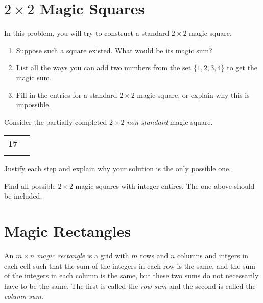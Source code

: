\documentclass[11pt]{article}
\renewenvironment{problem}{\begin{problems}}{\end{problems}\vspace{5pt}}
\begin{document}
\section{$2 \times 2$ Magic Squares}

\begin{problem}[6=2+2+2 points]
In this problem, you will try to construct a standard $2 \times 2$ magic square.
\begin{enumerate}[label=(\alph*)]
\item Suppose such a square existed. What would be its magic sum?

\item List all the ways you can add two numbers from the set $\{1, 2, 3, 4\}$ to get the magic sum.

\item Fill in the entries for a standard $2 \times 2$ magic square, or explain why this is impossible.
\end{enumerate}
\end{problem}

\begin{problem}[4 points]
Consider the partially-completed $2 \times 2$ \textit{non-standard} magic square.
\begin{center}
\begin{tabular}{|c|c|}
\hline
17 & \phantom{17} \\ \hline
 & \\ \hline
\end{tabular}
\end{center}
Justify each step and explain why your solution is the only possible one.
\end{problem}

\begin{problem}[4 points]
Find all possible $2 \times 2$ magic squares with integer entires. The one above should be included.
\end{problem}

\section{Magic Rectangles}

\begin{definition}
An $m \times n$ \textit{magic rectangle} is a grid with $m$ rows and $n$ columns and intgers in each cell such that
the sum of the integers in each row is the same, and the sum of the integers in each column is the same,
but these two sums do not necessarily have to be the same.
The first is called the \textit{row sum} and the second is called the \textit{column sum}.
\end{definition}
\end{document}
